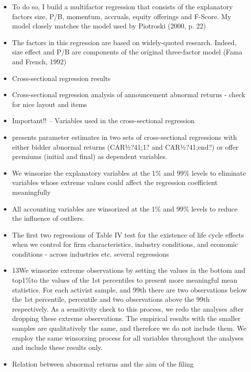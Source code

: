 \documentclass[12pt]{article}
\begin{document}
    \begin{itemize}
        \item To do so, I build a multifactor regression that consists of the explanatory factors size, P/B, momentum, accruals, equity offerings and F-Score. My model closely matches the model used by Piotroski (2000, p. 22) \citep{Mohr2012}

        \item The factors in this regression are based on widely-quoted research. Indeed, size effect and P/B are components of the original three-factor model (Fama and French, 1992) \citep{Mohr2012}

        \item Cross-sectional regression results \citep[p.3094]{Akhigbe2007}

        \item Cross-sectional regression analysis of announcement abnormal returns \citep{Moeller2004} - check for nice layout and items

        \item Important!! -- Variables used in the cross-sectional regression  \citep{Betton2009}

        \item presents parameter estimates in two sets of cross-sectional regressions with either bidder abnormal returns (CAR½?41;1? and CAR½?41;end?) or offer premiums (initial and final) as dependent variables. \citep{Betton2009}

        \item We winsorize the explanatory variables at the 1\% and 99\% levels to eliminate variables whose extreme values could affect the regression coefficient meaningfully \citep{Arikan2016}
        \item 
        All accounting variables are winsorized at the 1\% and 99\% levels to reduce the influence of outliers. \citep{Greenwood2009}
        \item The first two regressions of Table IV test for the existence of life cycle effects when we control for firm characteristics, industry conditions, and economic conditions \citep{Arikan2016} - across industries etc. several regressions

        \item 13We winsorize extreme observations by setting the values in the bottom and top1\%to the values of the 1st percentiles to present more meaningful mean statistics. For each activist sample, and 99th there are two observations below the 1st percentile, percentile and two observations above the 99th respectively. As a sensitivity check to this process, we redo the analyses after dropping these extreme observations. The empirical results with the smaller samples are qualitatively the same, and therefore we do not include them. We employ the same winsorzing process for all variables
        throughout the analyses and include these results only.

        \item Relation between abnormal returns and the aim of the filing \citep{Brav2008}
    \end{itemize}
\end{document}
